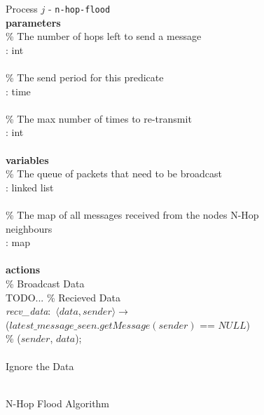 \begin{figure}[H]
  \centering
  \begin{boxedminipage}{\linewidth}
    \null Process $j$ - \verb|n-hop-flood|\\
    \null \textbf{parameters}\\
    \null\qq \% The number of hops left to send a message\\
    \null\qq {}: int\\~\\
    \null\qq \% The send period for this predicate\\
    \null\qq {}: time\\~\\
    \null\qq \% The max number of times to re-transmit\\
    \null\qq {}: int\\~\\
    \null \textbf{variables}\\
    \null\qq \% The queue of packets that need to be broadcast\\
    \null\qq {}: linked list\\~\\
    \null\qq \% The map of all messages received from the nodes N-Hop neighbours\\
    \null\qq {}: map\\~\\
    \null \textbf{actions}\\
    \null\qq \% Broadcast Data\\
    TODO...
    \null\qq \% Recieved Data\\
    \null\qq \emph{recv\_data}:~$\langle data, sender\rangle \rightarrow$\\
    \null\qq\qq {} ($latest\_message\_seen.getMessage(sender)$ == $NULL$) \\
    \null\qq\qq\qq \% ($sender$, $data$);\\
    \null\qq\qq {}\\
    \null\qq\qq\qq Ignore the Data\\
    \null\qq\qq {}\\
  \end{boxedminipage}
  \caption{N-Hop Flood Algorithm}
  \label{fig:n-hop-flood-algorithm}
\end{figure}



